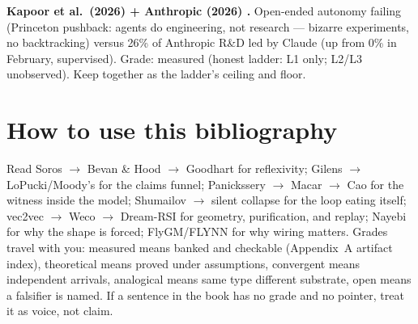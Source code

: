\textbf{Kapoor et al.\ (2026) \cite{kapoor2026} + Anthropic (2026) \cite{anthropic2026}.} Open-ended autonomy failing (Princeton pushback: agents do engineering, not research --- bizarre experiments, no backtracking) versus 26\% of Anthropic R\&D led by Claude (up from 0\% in February, supervised). Grade: measured (honest ladder: L1 only; L2/L3 unobserved). Keep together as the ladder's ceiling and floor.

\section*{How to use this bibliography}

Read Soros $\to$ Bevan \& Hood $\to$ Goodhart for reflexivity; Gilens $\to$ LoPucki/Moody's for the claims funnel; Panickssery $\to$ Macar $\to$ Cao for the witness inside the model; Shumailov $\to$ silent collapse for the loop eating itself; vec2vec $\to$ Weco $\to$ Dream-RSI for geometry, purification, and replay; Nayebi for why the shape is forced; FlyGM/FLYNN for why wiring matters. Grades travel with you: measured means banked and checkable (Appendix~A artifact index), theoretical means proved under assumptions, convergent means independent arrivals, analogical means same type different substrate, open means a falsifier is named. If a sentence in the book has no grade and no pointer, treat it as voice, not claim.
